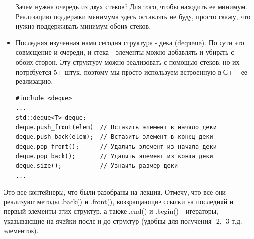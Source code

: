 \documentclass[a4paper,12pt]{article}
\begin{document}
\begin{itemize}
	      Зачем нужна очередь из двух стеков? Для того, чтобы находить ее минимум. Реализацию
	      поддержки минимума здесь оставлять не буду, просто скажу, что нужно поддерживать минимум
	      обоих стеков.

	\item Последняя изученная нами сегодня структура - дека (dequeue). По сути это совмещение
	      и очереди, и стека - элементы можно добавлять и убирать с обоих сторон. Эту структуру
	      можно реализовать с помощью стеков, но их потребуется 5+ штук, поэтому мы просто используем
	      встроенную в С++ ее реализацию.
	      \begin{verbatim}
#include <deque>
...
std::deque<T> deque;
deque.push_front(elem); // Вставить элемент в начало деки
deque.push_back(elem);  // Вставить элемент в конец деки
deque.pop_front();      // Удалить элемент из начала деки
deque.pop_back();       // Удалить элемент из конца деки
deque.size();           // Узнаить размер деки
...
\end{verbatim}

\end{itemize}

Это все контейнеры, что были разобраны на лекции. Отмечу, что все они реализуют методы
.back() и .front(), возвращающие ссылки на последний и первый элементы этих структур,
а также .end() и .begin() - итераторы, указывающие на ячейки после и до структур (удобны
для получения -2, -3 т.д. элементов).
\end{document}

